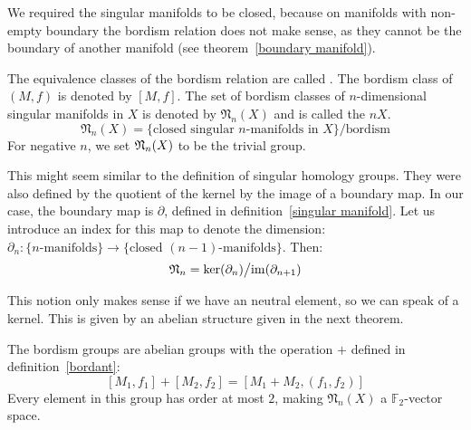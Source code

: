 \documentclass[a4paper,12pt]{article}
\begin{document}
\begin{remark}
    We required the singular manifolds to be closed, because on manifolds with non-empty boundary the bordism relation does not make sense, as they cannot be the boundary of another manifold (see theorem\ \ref{boundary manifold}).
\end{remark}

\begin{definition}
    The equivalence classes of the bordism relation are called . 
    The bordism class of \((M,f)\) is denoted by \([M,f]\). 
    The set of bordism classes of \(n\)-dimensional singular manifolds in \(X\) is denoted by \(\mathfrak{N}_n(X)\) and is called the \(n\)\(X\).
    \[\mathfrak{N}_n(X)=\{\text{closed singular \(n\)-manifolds in \(X\)}\}\big/\text{bordism}\]
    For negative \(n\), we set \(\mathfrak{N}_n(X)\) to be the trivial group.
\end{definition}

\begin{observation}
    This might seem similar to the definition of singular homology groups. They were also defined by the quotient of the kernel by the image of a boundary map.
    In our case, the boundary map is \(\partial\), defined in definition\ \ref{singular manifold}. Let us introduce an index for this map to denote the dimension: \(\partial_n:\{n\text{-manifolds}\}\to\{\text{closed }(n-1)\text{-manifolds}\}\).
    Then: \[\mathfrak{N}_n=\ker(\partial_n)\big/\mathrm{im}(\partial_{n+1})\]
\end{observation}

This notion only makes sense if we have an neutral element, so we can speak of a kernel. This is given by an abelian structure given in the next theorem. 

\begin{theorem}\label{group structure}
    The bordism groups are abelian groups with the operation \(+\) defined in definition\ \ref{bordant}:
    \[[M_1,f_1]+[M_2,f_2]=[M_1+M_2,(f_1,f_2)]\]
    Every element in this group has order at most \(2\), making \(\mathfrak{N}_n(X)\) a \(\mathbb{F}_2\)-vector space.
\end{theorem}
\end{document}
